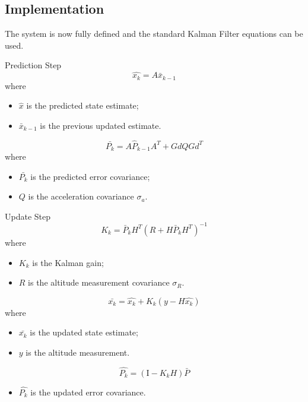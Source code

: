 \newpage

\subsection{Implementation}
The system is now fully defined and the standard Kalman Filter equations can be used.\cite{kalman-introduction}

Prediction Step
\begin{equation}
    \hat{x_k} = A \bar{x}_{k-1}
\end{equation}
where
\begin{itemize}
    \item $\hat{x}$ is the predicted state estimate;
    \item $\bar{x}_{k-1}$ is the previous updated estimate.
\end{itemize}

\begin{equation}
    \bar{P_k} = A \hat{P}_{k-1} A^T + Gd Q Gd^T
\end{equation}
where
\begin{itemize}
    \item $\bar{P_k}$ is the predicted error covariance;
    \item $Q$ is the acceleration covariance $\sigma_a$.
\end{itemize}

Update Step
\begin{equation}
    K_k = \bar{P}_k H^T(R + H \bar{P}_k H^T)^{-1}
\end{equation}
where
\begin{itemize}
    \item $K_k$ is the Kalman gain;
    \item $R$ is the altitude measurement covariance $\sigma_R$.
\end{itemize}

\begin{equation}
    \bar{x_k} = \hat{x_k} + K_k(y-H\hat{x_k})
\end{equation}
where
\begin{itemize}
    \item $\bar{x_k}$ is the updated state estimate;
    \item $y$ is the altitude measurement. 
\end{itemize}

\begin{equation}
    \hat{P_k} = (\mathrm{I} - K_k H)\bar{P}
\end{equation}
\begin{itemize}
    \item $\hat{P_k}$ is the updated error covariance.
\end{itemize}

